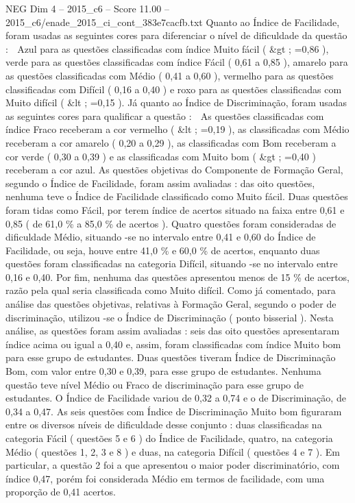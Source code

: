 \begin{textsample}{NEG Dim 4 – 2015\_c6 – Score 11.00 – 2015\_c6/enade\_2015\_ci\_cont\_383e7cacfb.txt}
Quanto ao Índice de Facilidade, foram usadas as seguintes cores para diferenciar o nível de dificuldade da questão :  Azul para as questões classificadas com índice Muito fácil ( \&gt ; =0,86 ), verde para as questões classificadas com índice Fácil ( 0,61 a 0,85 ), amarelo para as questões classificadas com Médio ( 0,41 a 0,60 ), vermelho para as questões classificadas com Difícil ( 0,16 a 0,40 ) e roxo para as questões classificadas com Muito difícil ( \&lt ; =0,15 ).
Já quanto ao Índice de Discriminação, foram usadas as seguintes cores para qualificar a questão :  As questões classificadas com índice Fraco receberam a cor vermelho ( \&lt ; =0,19 ), as classificadas com Médio receberam a cor amarelo ( 0,20 a 0,29 ), as classificadas com Bom receberam a cor verde ( 0,30 a 0,39 ) e as classificadas com Muito bom ( \&gt ; =0,40 ) receberam a cor azul.
As questões objetivas do Componente de Formação Geral, segundo o Índice de Facilidade, foram assim avaliadas : das oito questões, nenhuma teve o Índice de Facilidade classificado como Muito fácil.
Duas questões foram tidas como Fácil, por terem índice de acertos situado na faixa entre 0,61 e 0,85 ( de 61,0 \% a 85,0 \% de acertos ).
Quatro questões foram consideradas de dificuldade Médio, situando -se no intervalo entre 0,41 e 0,60 do Índice de Facilidade, ou seja, houve entre 41,0 \% e 60,0 \% de acertos, enquanto duas questões foram classificadas na categoria Difícil, situando -se no intervalo entre 0,16 e 0,40.
Por fim, nenhuma das questões apresentou menos de 15 \% de acertos, razão pela qual seria classificada como Muito difícil.
Como já comentado, para análise das questões objetivas, relativas à Formação Geral, segundo o poder de discriminação, utilizou -se o Índice de Discriminação ( ponto bisserial ).
Nesta análise, as questões foram assim avaliadas : seis das oito questões apresentaram índice acima ou igual a 0,40 e, assim, foram classificadas com índice Muito bom para esse grupo de estudantes.
Duas questões tiveram Índice de Discriminação Bom, com valor entre 0,30 e 0,39, para esse grupo de estudantes.
Nenhuma questão teve nível Médio ou Fraco de discriminação para esse grupo de estudantes.
O Índice de Facilidade variou de 0,32 a 0,74 e o de Discriminação, de 0,34 a 0,47.
As seis questões com Índice de Discriminação Muito bom figuraram entre os diversos níveis de dificuldade desse conjunto : duas classificadas na categoria Fácil ( questões 5 e 6 ) do Índice de Facilidade, quatro, na categoria Médio ( questões 1, 2, 3 e 8 ) e duas, na categoria Difícil ( questões 4 e 7 ).
Em particular, a questão 2 foi a que apresentou o maior poder discriminatório, com índice 0,47, porém foi considerada Médio em termos de facilidade, com uma proporção de 0,41 acertos.

\end{textsample}
